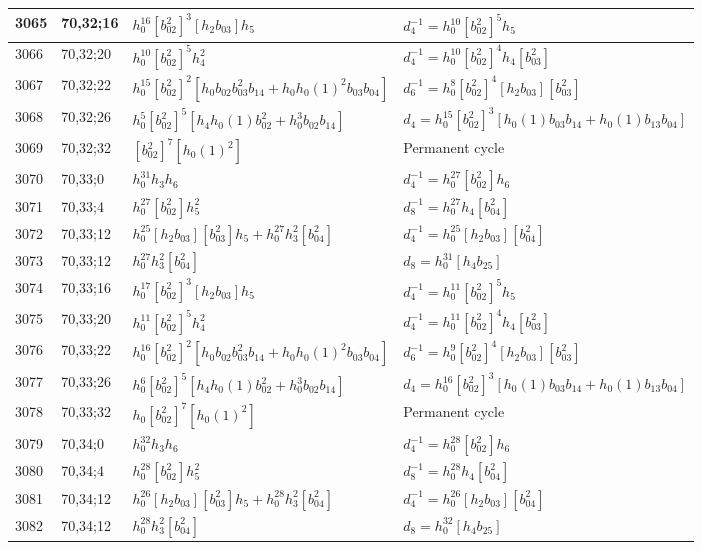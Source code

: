 \documentclass{article}
\begin{document}
\begin{longtable}{|l|l|>{\raggedright\arraybackslash}p{6cm}|>{\raggedright\arraybackslash}p{6cm}|}
\hline
3065 & 70,32;16 & $h_0^{16}[b_{02}^2]^3[h_2b_{03}]h_5$ & $d_{4}^{-1}=h_0^{10}[b_{02}^2]^5h_5$\\
\hline
3066 & 70,32;20 & $h_0^{10}[b_{02}^2]^5h_4^2$ & $d_{4}^{-1}=h_0^{10}[b_{02}^2]^4h_4[b_{03}^2]$\\
\hline
3067 & 70,32;22 & $h_0^{15}[b_{02}^2]^2[h_0b_{02}b_{03}^2b_{14} + h_0h_0(1)^2b_{03}b_{04}]$ & $d_{6}^{-1}=h_0^8[b_{02}^2]^4[h_2b_{03}][b_{03}^2]$\\
\hline
3068 & 70,32;26 & $h_0^5[b_{02}^2]^5[h_4h_0(1)b_{02}^2 + h_0^3b_{02}b_{14}]$ &$d_{4}=h_0^{15}[b_{02}^2]^3[h_0(1)b_{03}b_{14} + h_0(1)b_{13}b_{04}]$\\
\hline
3069 & 70,32;32 & $[b_{02}^2]^7[h_0(1)^2]$ & Permanent cycle\\
\hline
3070 & 70,33;0 & $h_0^{31}h_3h_6$ & $d_{4}^{-1}=h_0^{27}[b_{02}^2]h_6$\\
\hline
3071 & 70,33;4 & $h_0^{27}[b_{02}^2]h_5^2$ & $d_{8}^{-1}=h_0^{27}h_4[b_{04}^2]$\\
\hline
3072 & 70,33;12 & $h_0^{25}[h_2b_{03}][b_{03}^2]h_5 + h_0^{27}h_3^2[b_{04}^2]$ & $d_{4}^{-1}=h_0^{25}[h_2b_{03}][b_{04}^2]$\\
3073 & 70,33;12 & $h_0^{27}h_3^2[b_{04}^2]$ &$d_{8}=h_0^{31}[h_4b_{25}]$\\
\hline
3074 & 70,33;16 & $h_0^{17}[b_{02}^2]^3[h_2b_{03}]h_5$ & $d_{4}^{-1}=h_0^{11}[b_{02}^2]^5h_5$\\
\hline
3075 & 70,33;20 & $h_0^{11}[b_{02}^2]^5h_4^2$ & $d_{4}^{-1}=h_0^{11}[b_{02}^2]^4h_4[b_{03}^2]$\\
\hline
3076 & 70,33;22 & $h_0^{16}[b_{02}^2]^2[h_0b_{02}b_{03}^2b_{14} + h_0h_0(1)^2b_{03}b_{04}]$ & $d_{6}^{-1}=h_0^9[b_{02}^2]^4[h_2b_{03}][b_{03}^2]$\\
\hline
3077 & 70,33;26 & $h_0^6[b_{02}^2]^5[h_4h_0(1)b_{02}^2 + h_0^3b_{02}b_{14}]$ &$d_{4}=h_0^{16}[b_{02}^2]^3[h_0(1)b_{03}b_{14} + h_0(1)b_{13}b_{04}]$\\
\hline
3078 & 70,33;32 & $h_0[b_{02}^2]^7[h_0(1)^2]$ & Permanent cycle\\
\hline
3079 & 70,34;0 & $h_0^{32}h_3h_6$ & $d_{4}^{-1}=h_0^{28}[b_{02}^2]h_6$\\
\hline
3080 & 70,34;4 & $h_0^{28}[b_{02}^2]h_5^2$ & $d_{8}^{-1}=h_0^{28}h_4[b_{04}^2]$\\
\hline
3081 & 70,34;12 & $h_0^{26}[h_2b_{03}][b_{03}^2]h_5 + h_0^{28}h_3^2[b_{04}^2]$ & $d_{4}^{-1}=h_0^{26}[h_2b_{03}][b_{04}^2]$\\
3082 & 70,34;12 & $h_0^{28}h_3^2[b_{04}^2]$ &$d_{8}=h_0^{32}[h_4b_{25}]$\\

\end{longtable}
\end{document}
